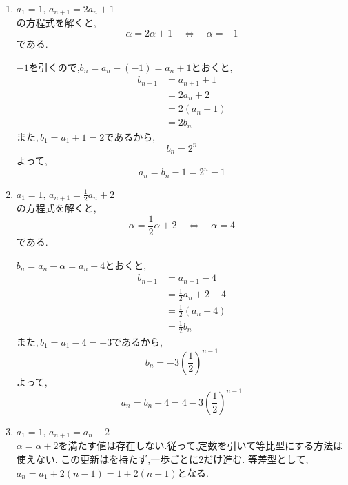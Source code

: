 \noindent{}\par\nobreak
\begin{enumerate}[label=(\arabic*),parsep=3pt,format=\bookitemlink{example-characteristic-1}{solution}{problem}]
  \item $\displaystyle a_1=1,\,a_{n+1}=2a_n+1$\\
        の方程式を解くと,
        \[
          \alpha=2\alpha+1
          \quad\Longleftrightarrow\quad
          \alpha=-1
        \]
        である.

        $-1$を引くので,$b_n=a_n-(-1)=a_n+1$とおくと,
        \begin{align*}
          b_{n+1}
            &=a_{n+1}+1\\
            &=2a_n+2\\
            &=2(a_n+1)\\
            &=2b_n
        \end{align*}
        また,\,$b_1=a_1+1=2$であるから,
        \[
          b_n=2^n
        \]
        よって,
        \[
          a_n=b_n-1=2^n-1
        \]

  \item $\displaystyle a_1=1,\,a_{n+1}=\frac12a_n+2$\\
          の方程式を解くと,
          \[
            \alpha=\frac12\alpha+2
            \quad\Longleftrightarrow\quad
            \alpha=4
          \]
          である.

          $b_n=a_n-\alpha=a_n-4$とおくと,
          \begin{align*}
            b_{n+1}
              &=a_{n+1}-4\\
              &=\frac12a_n+2-4\\
              &=\frac12(a_n-4)\\
              &=\frac12b_n
          \end{align*}
          また,\,$b_1=a_1-4=-3$であるから,
          \[
            b_n=-3\left(\frac12\right)^{n-1}
          \]
          よって,
          \[
            a_n=b_n+4
            =4-3\left(\frac12\right)^{n-1}
          \]
   \item $\displaystyle a_1=1,\, a_{n+1}=a_n+2$\\
         $\alpha=\alpha+2$を満たす値は存在しない.従って,定数を引いて等比型にする方法は使えない.
         この更新はを持たず,一歩ごとに$2$だけ進む.
         等差型として,$a_n=a_1+2(n-1)=1+2(n-1)$となる.
\end{enumerate}

